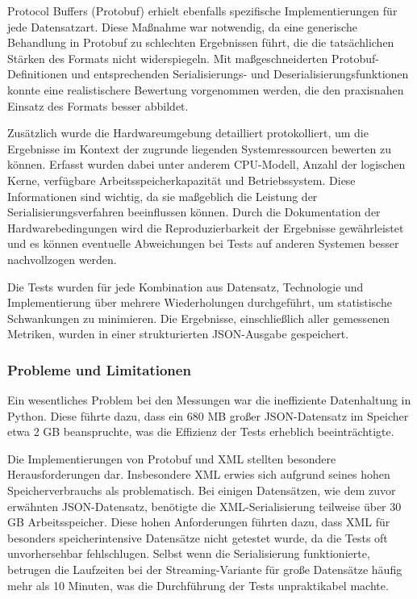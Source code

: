 \documentclass[ngerman]{seminarvorlage}
\begin{document}
Protocol Buffers (Protobuf) erhielt ebenfalls spezifische Implementierungen für jede Datensatzart. Diese Maßnahme war notwendig, da eine generische Behandlung in Protobuf zu schlechten Ergebnissen führt, die die tatsächlichen Stärken des Formats nicht widerspiegeln. Mit maßgeschneiderten Protobuf-Definitionen und entsprechenden Serialisierungs- und Deserialisierungsfunktionen konnte eine realistischere Bewertung vorgenommen werden, die den praxisnahen Einsatz des Formats besser abbildet.

Zusätzlich wurde die Hardwareumgebung detailliert protokolliert, um die Ergebnisse im Kontext der zugrunde liegenden Systemressourcen bewerten zu können. Erfasst wurden dabei unter anderem CPU-Modell, Anzahl der logischen Kerne, verfügbare Arbeitsspeicherkapazität und Betriebssystem. Diese Informationen sind wichtig, da sie maßgeblich die Leistung der Serialisierungsverfahren beeinflussen können. Durch die Dokumentation der Hardwarebedingungen wird die Reproduzierbarkeit der Ergebnisse gewährleistet und es können eventuelle Abweichungen bei Tests auf anderen Systemen besser nachvollzogen werden.

Die Tests wurden für jede Kombination aus Datensatz, Technologie und Implementierung über mehrere Wiederholungen durchgeführt, um statistische Schwankungen zu minimieren. Die Ergebnisse, einschließlich aller gemessenen Metriken, wurden in einer strukturierten JSON-Ausgabe gespeichert.

\subsubsection{Probleme und Limitationen}

Ein wesentliches Problem bei den Messungen war die ineffiziente Datenhaltung in Python. Diese führte dazu, dass ein 680 MB großer JSON-Datensatz im Speicher etwa 2 GB beanspruchte, was die Effizienz der Tests erheblich beeinträchtigte.

Die Implementierungen von Protobuf und XML stellten besondere Herausforderungen dar. Insbesondere XML erwies sich aufgrund seines hohen Speicherverbrauchs als problematisch. Bei einigen Datensätzen, wie dem zuvor erwähnten JSON-Datensatz, benötigte die XML-Serialisierung teilweise über 30 GB Arbeitsspeicher. Diese hohen Anforderungen führten dazu, dass XML für besonders speicherintensive Datensätze nicht getestet wurde, da die Tests oft unvorhersehbar fehlschlugen. Selbst wenn die Serialisierung funktionierte, betrugen die Laufzeiten bei der Streaming-Variante für große Datensätze häufig mehr als 10 Minuten, was die Durchführung der Tests unpraktikabel machte.
\end{document}
